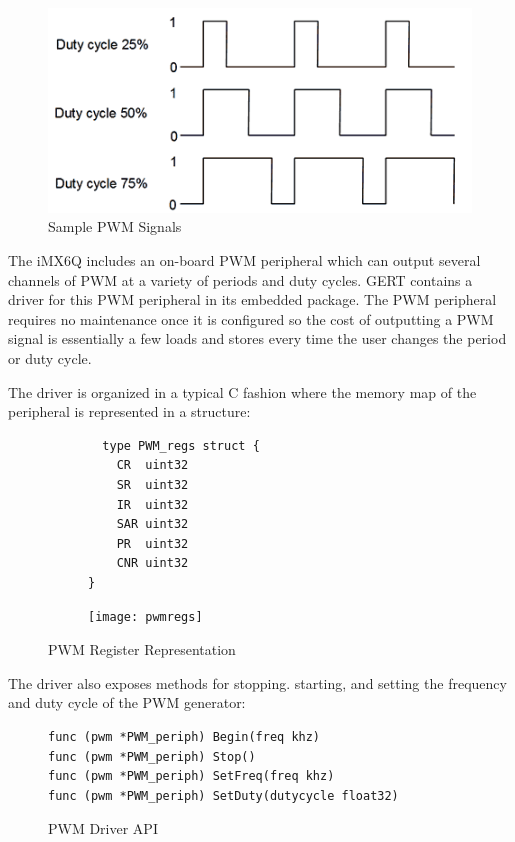 \begin{figure}[h]
\begin{center}
  \includegraphics[scale=0.5]{pwm}
\end{center}
  \caption{Sample PWM Signals} \label{fig:pwm}
\end{figure}


The iMX6Q includes an on-board PWM peripheral which can output several channels of PWM
at a variety of periods and duty cycles. GERT contains a driver for this PWM peripheral in its embedded
package. The PWM peripheral requires no maintenance once it is configured so the cost of outputting
a PWM signal is essentially a few loads and stores every time the user changes the period or duty cycle.

The driver is organized in a typical C fashion where the memory map of the peripheral is represented in a structure:
\begin{figure}[h]
  \begin{subfigure}[t!]{0.5\textwidth}
  \begin{lstlisting}
  type PWM_regs struct {
	CR  uint32
	SR  uint32
	IR  uint32
	SAR uint32
	PR  uint32
	CNR uint32
}
  \end{lstlisting}
  \end{subfigure}
  \begin{subfigure}[t!]{0.5\textwidth}
 \texttt{[image: pwmregs]}
  \end{subfigure}
  \caption{PWM Register Representation} \label{fig:pwm_struct}
\end{figure}

The driver also exposes methods for stopping. starting, and setting the
frequency and duty cycle of the PWM generator:
\begin{figure}[h]
  \begin{lstlisting}
func (pwm *PWM_periph) Begin(freq khz)
func (pwm *PWM_periph) Stop()
func (pwm *PWM_periph) SetFreq(freq khz)
func (pwm *PWM_periph) SetDuty(dutycycle float32)
  \end{lstlisting}
  \caption{PWM Driver API} \label{fig:pwm_api}
\end{figure}

